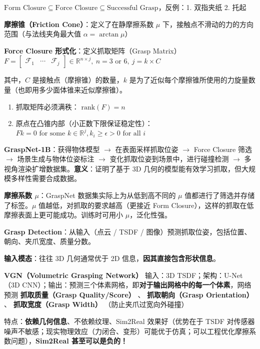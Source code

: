 \documentclass[
  8pt]{extarticle}
\providecommand{\tightlist}{%
  \setlength{\itemsep}{0pt}\setlength{\parskip}{0pt}}
\begin{document}
\begin{multicols*}{4}
\(\text{Form Closure} \subseteq \text{Force Closure} \subseteq \text{Successful Grasp}\)，反例：1.
双指夹纸 2. 托起

\textbf{摩擦锥（Friction Cone）}：定义了在静摩擦系数 \(\mu\)
下，接触点不滑动的力的方向范围（与法线夹角最大值
\(\alpha = \arctan \mu\)）

\textbf{Force Closure 形式化}：定义抓取矩阵（Grasp
Matrix）\(F = \begin{bmatrix} \mathcal{F}_1 & \cdots & \mathcal{F}_j \end{bmatrix} \in \mathbb{R}^{n \times j},\ n = 3 \text{ or } 6,\ j = k \times C\)

其中，\(C\) 是接触点（摩擦锥）的数量，\(k\)
是为了近似每个摩擦锥所使用的力旋量数量（也即用多少面体锥来近似摩擦锥）。

\begin{enumerate}
\def\labelenumi{\arabic{enumi}.}
\tightlist
\item
  抓取矩阵必须满秩： \(\text{rank}(F)=n\)
\item
  原点在凸锥内部（小正数下限保证稳定性）：\(Fk = 0 \text{ for some } k \in \mathbb{R}^j, k_i \ge \epsilon > 0 \text{ for all } i\)
\end{enumerate}

\textbf{GraspNet-1B}：获得物体模型 \(\to\) 在表面采样抓取位姿 \(\to\)
Force Closure 筛选 \(\to\) 场景生成与物体位姿标注 \(\to\)
变化抓取位姿到场景中，进行碰撞检测 \(\to\)
多视角渲染扩增数据集。\textbf{意义}：证明了基于 3D
几何的模型能有效学习抓取，但大规模多样性需要合成数据。

\textbf{摩擦系数 \(\mu\)}：GraspNet 数据集实际上为从低到高不同的 \(\mu\)
值都进行了筛选并存储了标签。\(\mu\) 值越低，对抓取的要求越高（更接近
Form Closure），这样的抓取在低摩擦表面上更可能成功。训练时可用小
\(\mu\)，泛化性强。

\textbf{Grasp Detection}：从输入（点云 / TSDF /
图像）预测抓取位姿，包括位置、朝向、夹爪宽度、质量分数。

\textbf{输入模态}：往往 3D 几何通常优于 2D
信息，\textbf{因其直接包含形状信息}。

\textbf{VGN（Volumetric Grasping Network）} 输入：3D
TSDF；架构：U-Net（3D
CNN）；输出：预测三个体素网格，即\textbf{对于输出网格中的每一个体素}，网络预测
\textbf{抓取质量（Grasp Quality/Score）} 、 \textbf{抓取朝向（Grasp
Orientation）} 、 \textbf{抓取宽度（Grasp Width）}
（防止夹爪过宽向外碰撞）

特点：\textbf{依赖几何信息}、不依赖纹理、Sim2Real 效果好（优势在于 TSDF
对传感器噪声不敏感；现实物理效应（力闭合、变形）可能优于仿真；可以工程优化摩擦系数问题），\textbf{Sim2Real
甚至可以是负的！}


\end{multicols*}
\end{document}
